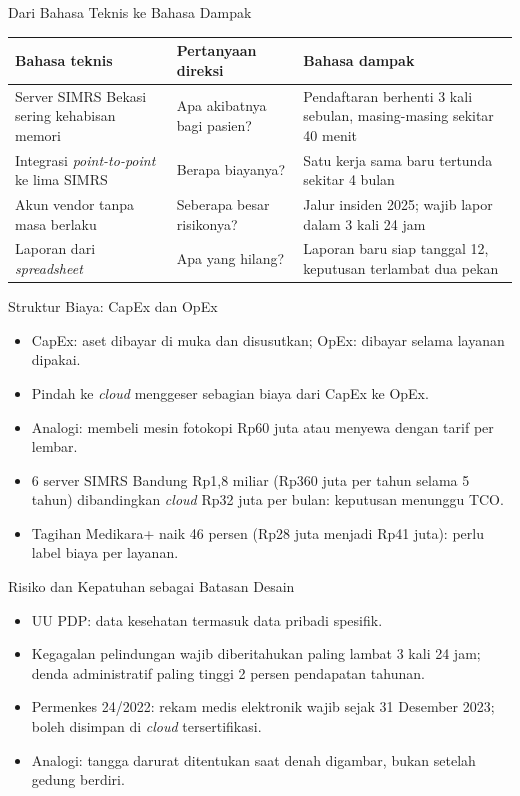\documentclass[aspectratio=169, table, 12pt]{beamer}
\begin{document}
\begin{frame}{Dari Bahasa Teknis ke Bahasa Dampak}
  \footnotesize
  \begin{tabularx}{\textwidth}{>{\raggedright\arraybackslash}X
                               >{\raggedright\arraybackslash}p{3.2cm}
                               >{\raggedright\arraybackslash}X}
    \hline
    \textbf{Bahasa teknis} & \textbf{Pertanyaan direksi} & \textbf{Bahasa dampak} \\
    \hline
    Server SIMRS Bekasi sering kehabisan memori & Apa akibatnya bagi pasien? &
      Pendaftaran berhenti 3 kali sebulan, masing-masing sekitar 40 menit \\
    \hline
    Integrasi \textit{point-to-point} ke lima SIMRS & Berapa biayanya? & Satu kerja
      sama baru tertunda sekitar 4 bulan \\
    \hline
    Akun vendor tanpa masa berlaku & Seberapa besar risikonya? & Jalur insiden 2025;
      wajib lapor dalam 3 kali 24 jam \\
    \hline
    Laporan dari \textit{spreadsheet} & Apa yang hilang? & Laporan baru siap tanggal
      12, keputusan terlambat dua pekan \\
    \hline
  \end{tabularx}
\end{frame}

\begin{frame}{Struktur Biaya: CapEx dan OpEx}
  \begin{itemize}
    \item CapEx: aset dibayar di muka dan disusutkan; OpEx: dibayar selama layanan
          dipakai.
    \item Pindah ke \textit{cloud} menggeser sebagian biaya dari CapEx ke OpEx.
    \item Analogi: membeli mesin fotokopi Rp60 juta atau menyewa dengan tarif per
          lembar.
    \item 6 server SIMRS Bandung Rp1,8 miliar (Rp360 juta per tahun selama 5 tahun)
          dibandingkan \textit{cloud} Rp32 juta per bulan: keputusan menunggu TCO.
    \item Tagihan Medikara+ naik 46 persen (Rp28 juta menjadi Rp41 juta): perlu label
          biaya per layanan.
  \end{itemize}
\end{frame}

\begin{frame}{Risiko dan Kepatuhan sebagai Batasan Desain}
  \begin{itemize}
    \item UU PDP: data kesehatan termasuk data pribadi spesifik.
    \item Kegagalan pelindungan wajib diberitahukan paling lambat 3 kali 24 jam;
          denda administratif paling tinggi 2 persen pendapatan tahunan.
    \item Permenkes 24/2022: rekam medis elektronik wajib sejak 31 Desember 2023;
          boleh disimpan di \textit{cloud} tersertifikasi.
    \item Analogi: tangga darurat ditentukan saat denah digambar, bukan setelah
          gedung berdiri.
  \end{itemize}
\end{frame}
\end{document}
